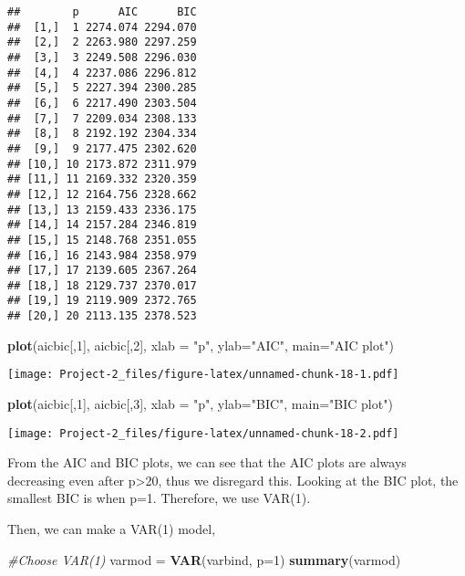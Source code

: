 \documentclass[]{article}
\newenvironment{Shaded}{\begin{snugshade}}{\end{snugshade}}
\newcommand{\KeywordTok}[1]{\textcolor[rgb]{0.13,0.29,0.53}{\textbf{#1}}}
\newcommand{\DataTypeTok}[1]{\textcolor[rgb]{0.13,0.29,0.53}{#1}}
\newcommand{\DecValTok}[1]{\textcolor[rgb]{0.00,0.00,0.81}{#1}}
\newcommand{\StringTok}[1]{\textcolor[rgb]{0.31,0.60,0.02}{#1}}
\newcommand{\CommentTok}[1]{\textcolor[rgb]{0.56,0.35,0.01}{\textit{#1}}}
\newcommand{\NormalTok}[1]{#1}
\begin{document}
\begin{verbatim}
##        p      AIC      BIC
##  [1,]  1 2274.074 2294.070
##  [2,]  2 2263.980 2297.259
##  [3,]  3 2249.508 2296.030
##  [4,]  4 2237.086 2296.812
##  [5,]  5 2227.394 2300.285
##  [6,]  6 2217.490 2303.504
##  [7,]  7 2209.034 2308.133
##  [8,]  8 2192.192 2304.334
##  [9,]  9 2177.475 2302.620
## [10,] 10 2173.872 2311.979
## [11,] 11 2169.332 2320.359
## [12,] 12 2164.756 2328.662
## [13,] 13 2159.433 2336.175
## [14,] 14 2157.284 2346.819
## [15,] 15 2148.768 2351.055
## [16,] 16 2143.984 2358.979
## [17,] 17 2139.605 2367.264
## [18,] 18 2129.737 2370.017
## [19,] 19 2119.909 2372.765
## [20,] 20 2113.135 2378.523
\end{verbatim}

\begin{Shaded}
\begin{Highlighting}[]
\KeywordTok{plot}\NormalTok{(aicbic[,}\DecValTok{1}\NormalTok{], aicbic[,}\DecValTok{2}\NormalTok{], }\DataTypeTok{xlab =} \StringTok{"p"}\NormalTok{, }\DataTypeTok{ylab=}\StringTok{"AIC"}\NormalTok{, }\DataTypeTok{main=}\StringTok{"AIC plot"}\NormalTok{)}
\end{Highlighting}
\end{Shaded}

\texttt{[image: Project-2\_files/figure-latex/unnamed-chunk-18-1.pdf]}

\begin{Shaded}
\begin{Highlighting}[]
\KeywordTok{plot}\NormalTok{(aicbic[,}\DecValTok{1}\NormalTok{], aicbic[,}\DecValTok{3}\NormalTok{], }\DataTypeTok{xlab =} \StringTok{"p"}\NormalTok{, }\DataTypeTok{ylab=}\StringTok{"BIC"}\NormalTok{, }\DataTypeTok{main=}\StringTok{"BIC plot"}\NormalTok{)}
\end{Highlighting}
\end{Shaded}

\texttt{[image: Project-2\_files/figure-latex/unnamed-chunk-18-2.pdf]}

From the AIC and BIC plots, we can see that the AIC plots are always
decreasing even after p\textgreater{}20, thus we disregard this. Looking
at the BIC plot, the smallest BIC is when p=1. Therefore, we use VAR(1).

Then, we can make a VAR(1) model,

\begin{Shaded}
\begin{Highlighting}[]
\CommentTok{#Choose VAR(1)}
\NormalTok{varmod =}\StringTok{ }\KeywordTok{VAR}\NormalTok{(varbind, }\DataTypeTok{p=}\DecValTok{1}\NormalTok{)}
\KeywordTok{summary}\NormalTok{(varmod)}
\end{Highlighting}
\end{Shaded}
\end{document}
